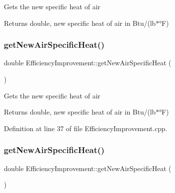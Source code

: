 Gets the new specific heat of air

\begin{DoxyReturn}{Returns}
double, new specific heat of air in Btu/(lb$\ast$°F) 
\end{DoxyReturn}
\mbox{\label{class_efficiency_improvement_a71ab10ba190cb99edb85fcd7f679e721}} 
\subsubsection{\texorpdfstring{get\+New\+Air\+Specific\+Heat()}{getNewAirSpecificHeat()}\hspace{0.1cm}{\footnotesize\ttfamily [2/3]}}
{\footnotesize\ttfamily double Efficiency\+Improvement\+::get\+New\+Air\+Specific\+Heat (\begin{DoxyParamCaption}{ }\end{DoxyParamCaption})}

Gets the new specific heat of air

\begin{DoxyReturn}{Returns}
double, new specific heat of air in Btu/(lb$\ast$°F) 
\end{DoxyReturn}


Definition at line 37 of file Efficiency\+Improvement.\+cpp.

\mbox{\label{class_efficiency_improvement_a71ab10ba190cb99edb85fcd7f679e721}} 
\subsubsection{\texorpdfstring{get\+New\+Air\+Specific\+Heat()}{getNewAirSpecificHeat()}\hspace{0.1cm}{\footnotesize\ttfamily [3/3]}}
{\footnotesize\ttfamily double Efficiency\+Improvement\+::get\+New\+Air\+Specific\+Heat (\begin{DoxyParamCaption}{ }\end{DoxyParamCaption})}


